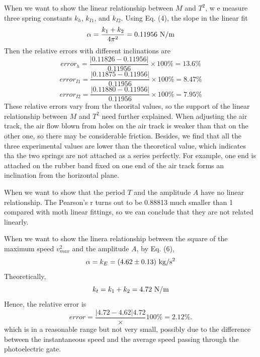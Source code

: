 \documentclass[a4paper]{report}
\begin{document}
	When we want to show the linear relationship between $M$ and $T^2$, w e measure three spring constants $k_h$, $k_{I1}$, and $k_{I2}$. Using Eq. (4), the slope in the linear fit
	\begin{equation*}
	\alpha=\dfrac{k_1+k_2}{4\pi^2}=0.11956\ \rm{N/m}
	\end{equation*}
	Then the relative errors with different inclinations are
	\begin{equation*}
	error_{h}=\dfrac{|0.11826-0.11956|}{0.11956}\times100\%=13.6\%
	\end{equation*}
	\begin{equation*}
	error_{I1}=\dfrac{|0.11875-0.11956|}{0.11956}\times100\%=8.47\%
	\end{equation*}
	\begin{equation*}
	error_{I2}=\dfrac{|0.11880-0.11956|}{0.11956}\times100\%=7.95\%
	\end{equation*}
	These relative errors vary from the theorital values, so the support of the linear relationship between $M$ and $T^2$ need further explained. When adjusting the air track, the air flow blown from holes on the air track is  weaker than that on the other one, so there may be considerable friction. Besides, we find that all the three experimental values are lower than the theoretical value, which indicates tha the two springs are not attached as a series perfectly. For example, one end is attached on the rubber band fixed on one end of the air track forms an inclination from the horizontal plane.
	
	When we want to show that the period $T$ and the amplitude $A$ have no linear relationship. The Pearson's r turns out to be 0.88813 much smaller than 1 compared with moth linear fittings, so we can conclude that they are not related linearly.
	
	When we want to show the linera relationship between the square of the maximum speed $v_{max}^2$ and the amplitude $A$, by Eq. (6),
	\begin{equation*}
	\alpha=k_E=(4.62\pm0.13)\ \rm{kg/s^2}
	\end{equation*}
	Theoretically,
	\begin{equation*}
	k_t=k_1+k_2=4.72\ \rm{N/m}
	\end{equation*}
	Hence, the relative error is
	\begin{equation*}
	error=\dfrac{\left|4.72-4.62\right|{4.72}}\times100\%=2.12\%.
	\end{equation*}
	which is in a reasonable range but not very small, possibly due to the difference between the instantaneous speed and the average speed passing through the photoelectric gate.
	
\end{document}
